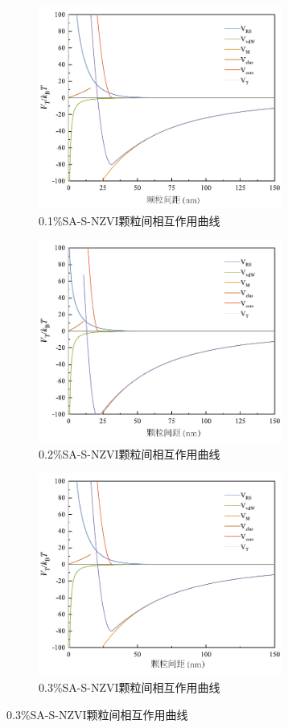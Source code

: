 \begin{figure}[htbp]
    \centering
    \begin{subfigure}{8cm}
		\includegraphics[width=8cm]{figs/fig8.pdf}
        \caption{0.1\%SA-S-NZVI颗粒间相互作用曲线}
        \label{fig8}
	\end{subfigure}

	\begin{subfigure}{8cm}
		\includegraphics[width=8cm]{figs/fig9.pdf}
        \caption{0.2\%SA-S-NZVI颗粒间相互作用曲线}
        \label{fig9}
	\end{subfigure}

    \begin{subfigure}{8cm}
		\includegraphics[width=8cm]{figs/fig10.pdf}
        \caption{0.3\%SA-S-NZVI颗粒间相互作用曲线}
        \label{fig10}
	\end{subfigure}
\end{figure}

